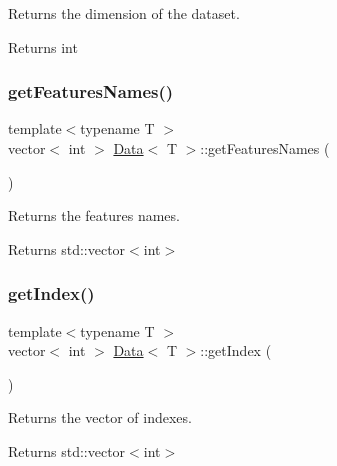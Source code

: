 Returns the dimension of the dataset. 

\begin{DoxyReturn}{Returns}
int 
\end{DoxyReturn}
\mbox{\label{class_data_a7ca6dfe5013024d75f3e13e42caa96f4}} 
\subsubsection{\texorpdfstring{get\+Features\+Names()}{getFeaturesNames()}}
{\footnotesize\ttfamily template$<$typename T $>$ \\
vector$<$ int $>$ \mbox{\hyperlink{class_data}{Data}}$<$ T $>$\+::get\+Features\+Names (\begin{DoxyParamCaption}{ }\end{DoxyParamCaption})}



Returns the features names. 

\begin{DoxyReturn}{Returns}
std\+::vector$<$int$>$ 
\end{DoxyReturn}
\mbox{\label{class_data_a9f64e56cea5be1f29eea9319716a3ed1}} 
\subsubsection{\texorpdfstring{get\+Index()}{getIndex()}}
{\footnotesize\ttfamily template$<$typename T $>$ \\
vector$<$ int $>$ \mbox{\hyperlink{class_data}{Data}}$<$ T $>$\+::get\+Index (\begin{DoxyParamCaption}{ }\end{DoxyParamCaption})}



Returns the vector of indexes. 

\begin{DoxyReturn}{Returns}
std\+::vector$<$int$>$ 
\end{DoxyReturn}
\mbox{\label{class_data_a9494572e8a2bc92fb4c10087cf35e4be}} 
